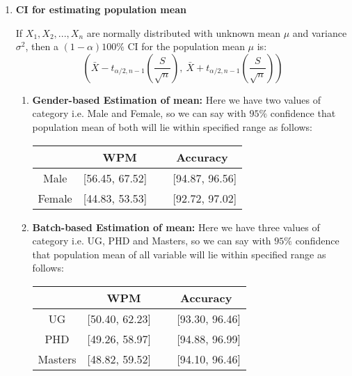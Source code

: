 \documentclass[12pt,a4paper]{report}
\begin{document}
\begin{enumerate}[label=\textbf{\arabic*})]
    \item \textbf{\Large{CI for estimating population mean}}
    
    If $X_1, X_2,..., X_n$ are normally distributed with unknown mean $\mu$ and variance $\sigma^2$, then a $(1 - \alpha)100\%$ CI for the population mean $\mu$ is:
    \[ \left(\bar{X} - t_{\alpha/2,n-1}\left(\frac{S}{\sqrt{n}}\right),\ \bar{X} + t_{\alpha/2,n-1}\left(\frac{S}{\sqrt{n}}\right)\right)
    \]
    \vspace{1mm}
    
    \begin{enumerate}
        \item \textbf{Gender-based Estimation of mean:}
        Here we have two values of category i.e. Male and Female, so we can say with $95\%$ confidence that population mean of both will lie within specified range as follows:
    \begin{center}
    \begin{tabular}{ |c|c|c|}
      \hline
       & WPM & Accuracy \\
      \hline
      Male & [56.45, 67.52] \ & \ [94.87, 96.56] \\ 
      \hline
      Female & [44.83, 53.53] \ & \ [92.72, 97.02] \\
      \hline
    \end{tabular}
    \end{center}
    \vspace{2mm}
        
        \item \textbf{Batch-based Estimation of mean:}
        Here we have three values of category i.e. UG, PHD and Masters, so we can say with $95\%$ confidence that population mean of all variable will lie within specified range as follows:
    \begin{center}
    \begin{tabular}{ |c|c|c|}
      \hline
       & WPM & Accuracy \\
      \hline
      UG & [50.40, 62.23] \ & \ [93.30, 96.46] \\ 
      \hline
      PHD & [49.26, 58.97] \ & \ [94.88, 96.99] \\
      \hline
      Masters & [48.82, 59.52] \ & \ [94.10, 96.46] \\
      \hline
    \end{tabular}
    \end{center}
    \vspace{2mm}
    

\end{enumerate}
\end{enumerate}
\end{document}
